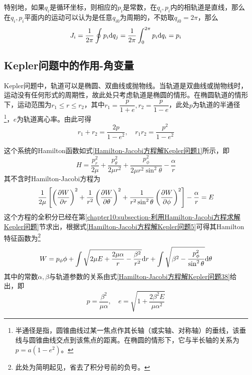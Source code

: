 特别地，如果$q_i$是循环坐标，则相应的$p_i$是常数，在$q_i,p_i$内的相轨道是直线，那么在$q_i,p_i$平面内的运动可以认为是任意$q_{i0}$为周期的，不妨取$q_{i0}=2\pi$，那么
\begin{equation*}
	J_i = \frac{1}{2\pi}\oint p_i\mathrm{d} q_j = \frac{1}{2\pi} \int_0^{2\pi}p_i\mathrm{d} q_i = p_i
\end{equation*}

\subsection{Kepler问题中的作用-角变量}

Kepler问题中，轨道可以是椭圆、双曲线或抛物线。当轨道是双曲线或抛物线时，运动没有任何形式的周期性，故此处只考虑轨道是椭圆的情形。在椭圆轨道的情形下，运动范围为$r_1\leqslant r \leqslant r_2$，其中$r_1=\dfrac{p}{1+e}, r_2=\dfrac{p}{1-e}$，此处$p$为轨道的半通径\footnote{半通径是指，圆锥曲线过某一焦点作其长轴（或实轴、对称轴）的垂线，该垂线与圆锥曲线交点到该焦点的距离。在椭圆的情形下，它与半长轴的关系为$p=a(1-e^2)$。}，$e$为轨道离心率。由此可得
\begin{equation}
	r_1+r_2 = \frac{2p}{1-e^2},\quad r_1r_2 = \frac{p^2}{1-e^2}
	\label{chapter10:Kepler问题中的作用-角变量：几何参数之间的关系}
\end{equation}

这个系统的Hamilton函数如式\eqref{Hamilton-Jacobi方程解Kepler问题1}所示，即
\begin{equation}
	H = \frac{p_r^2}{2\mu}+\frac{p_\theta^2}{2\mu r^2}+\frac{p_\phi^2}{2\mu r^2\sin^2\theta} - \frac{\alpha}{r}
	\label{chapter10:Kepler问题中的作用-角变量：Hamilton函数}
\end{equation}
其不含时Hamilton-Jacobi方程为
\begin{equation}
	\frac{1}{2\mu}\left[\left(\frac{\partial W}{\partial r}\right)^2 + \frac{1}{r^2}\left(\frac{\partial W}{\partial \theta}\right)^2 + \frac{1}{r^2\sin^2\theta}\left(\frac{\partial W}{\partial \phi}\right)^2\right] - \frac{\alpha}{r} = E
\end{equation}
这个方程的全积分已经在第\ref{chapter10:subsection-利用Hamilton-Jacobi方程求解Kepler问题}节求出，根据式\eqref{Hamilton-Jacobi方程解Kepler问题5}可得其Hamilton特征函数为\footnote{此处为简明起见，省去了积分号前的负号。}
\begin{equation}
	W = p_\phi\phi + \int \sqrt{2\mu E+\frac{2\mu\alpha}{r}-\frac{\beta^2}{r^2}} \mathrm{d} r + \int \sqrt{\beta^2-\frac{p_\phi^2}{\sin^2\theta}}\mathrm{d} \theta
\end{equation}
其中的常数$\alpha,\beta$与轨道参数的关系由式\eqref{Hamilton-Jacobi方程解Kepler问题38}给出，即
\begin{equation}
	p = \frac{\beta^2}{\mu\alpha},\quad e = \sqrt{1+\frac{2\beta^2E}{\mu\alpha^2}}
	\label{chapter10:Kepler问题中的作用-角变量：几何参数与积分常数之间的关系}
\end{equation}

